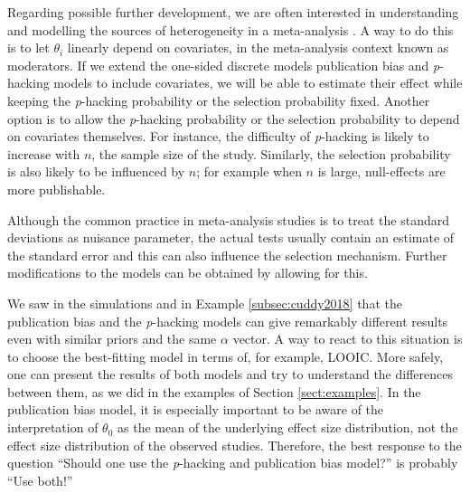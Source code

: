 \documentclass[useAMS,usenatbib,referee]{biom}
\begin{document}
Regarding possible further development, we are often interested in understanding and modelling the sources of heterogeneity in a meta-analysis \citep{thompson1994systematic}. A way to do this is to let $\theta_{i}$ linearly depend on covariates, in the meta-analysis context known as moderators. If we extend the one-sided discrete models publication bias and \textit{p}-hacking models to include covariates, we will be able to estimate their effect while keeping the \textit{p}-hacking probability or the selection probability fixed. Another option is to allow the \textit{p}-hacking probability or the selection probability to depend on covariates themselves. For instance, the difficulty of \textit{p}-hacking is likely to increase with $n$, the sample size of the study. Similarly, the selection probability is also likely to be influenced by $n$; for example when $n$ is large, null-effects are more publishable.

Although the common practice in meta-analysis studies is to treat the standard deviations as nuisance parameter, the actual tests usually contain an estimate of the standard error and this can also influence the selection mechanism. Further modifications to the models can be obtained by allowing for this. 


We saw in the simulations and in Example \ref{subsec:cuddy2018} that the publication bias and the \textit{p}-hacking models can give remarkably different results even with similar priors and the same $\alpha$ vector. A way to react to this situation is to choose the best-fitting model in terms of, for example, LOOIC. More safely, one can present the results of both models and try to understand the differences between them, as we did in the examples of Section \ref{sect:examples}. In the publication bias model, it is especially important to be aware of the interpretation of $\theta_{0}$ as the mean of the underlying effect size distribution, not the effect size distribution of the observed studies. Therefore, the best response to the question \enquote{Should one use the \textit{p}-hacking and publication bias model?} is probably \enquote{Use both!}
\end{document}
